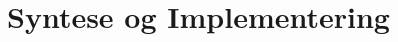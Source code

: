 \documentclass{article}
\begin{document}
\fi

\section{Syntese og Implementering}
\label{sec:synthesis}

\ifdefined\mainfile\else
\end{document}

